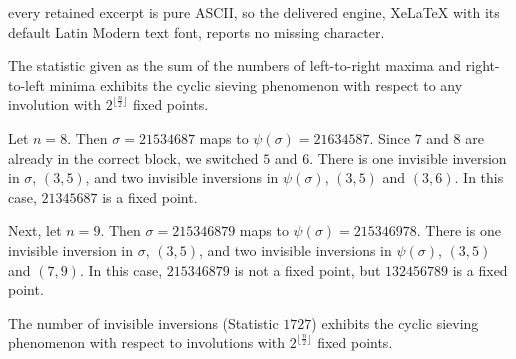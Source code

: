 \documentclass[10pt,a4paper]{amsart}
\begin{document}
every retained excerpt is pure ASCII, so the delivered engine, XeLaTeX with its default Latin Modern text font, reports no missing character.
\begin{thm}\label{thm:CSP_AK}
  The statistic given as the sum of the numbers of left-to-right maxima and right-to-left minima exhibits the cyclic sieving phenomenon with respect to any involution with $2^{\lfloor\frac{n}{2}\rfloor}$ fixed points.
\end{thm}

\begin{example}
  \label{ex:kappa_psi}
  Let $n = 8$. Then $\sigma = 21534687$ maps to $\psi(\sigma) = 21634587$.  Since $7$ and $8$ are already in the correct block, we switched $5$ and $6$. There is one invisible inversion in $\sigma$, $(3,5)$, and two invisible inversions in $\psi(\sigma)$, $(3, 5)$ and $(3, 6)$. In this case, $21345687$ is a fixed point.

  Next, let $n = 9$. Then $\sigma = 215346879$ maps to $\psi(\sigma) = 215346978$.  There is one invisible inversion in $\sigma$, $(3, 5)$, and two invisible inversions in $\psi(\sigma)$, $(3, 5)$ and $(7, 9)$. In this case, $215346879$ is not a fixed point, but $132456789$ is a fixed point.

\end{example}

\begin{thm}\label{thm:CSP_AK-Invisible}
  The number of invisible inversions (Statistic $1727$) exhibits the cyclic sieving phenomenon with respect to involutions with $2^{\lfloor\frac{n}{2}\rfloor}$ fixed points.
\end{thm}
\end{document}
